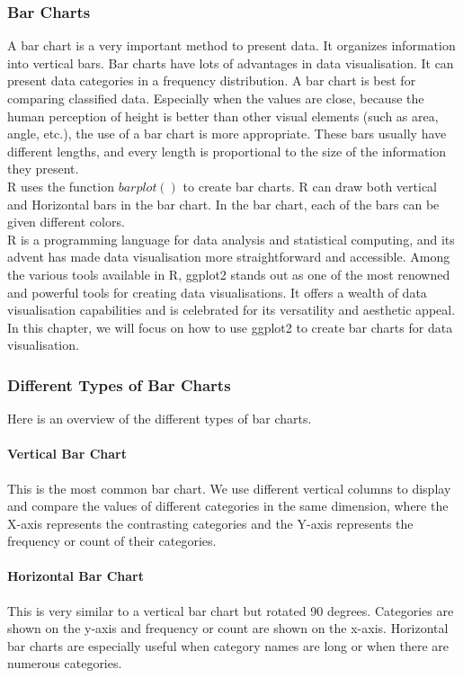 \documentclass{article}\usepackage[]{graphicx}\usepackage[]{xcolor}
\begin{document}
\subsubsection{Bar Charts}
A bar chart is a very important method to present data. It organizes information into vertical bars.  Bar charts have lots of advantages in data visualisation. It can present data categories in a frequency distribution. A bar chart is best for comparing classified data. Especially when the values are close, because the human perception of height is better than other visual elements (such as area, angle, etc.), the use of a bar chart is more appropriate. These bars usually have different lengths, and every length is proportional to the size of the information they present.\\
R uses the function $barplot()$ to create bar charts. R can draw both vertical and Horizontal bars in the bar chart. In the bar chart, each of the bars can be given different colors.\\
R is a programming language for data analysis and statistical computing, and its advent has made data visualisation more straightforward and accessible. Among the various tools available in R, ggplot2 stands out as one of the most renowned and powerful tools for creating data visualisations. It offers a wealth of data visualisation capabilities and is celebrated for its versatility and aesthetic appeal. In this chapter, we will focus on how to use ggplot2 to create bar charts for data visualisation.\\

\subsubsection{Different Types of Bar Charts}
Here is an overview of the different types of bar charts. \\
\paragraph{Vertical Bar Chart}
This is the most common bar chart. We use different vertical columns to display and compare the values of different categories in the same dimension, where the X-axis represents the contrasting categories and the Y-axis represents the frequency or count of their categories.\\
\paragraph{Horizontal Bar Chart}
This is very similar to a vertical bar chart but rotated 90 degrees. Categories are shown on the y-axis and frequency or count are shown on the x-axis. Horizontal bar charts are especially useful when category names are long or when there are numerous categories.
\end{document}
